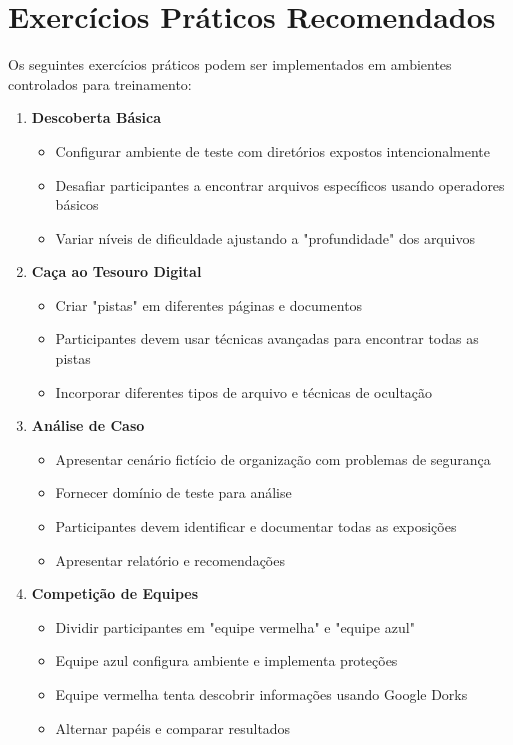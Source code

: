 \documentclass[12pt,a4paper]{book}
\begin{document}
\section{Exercícios Práticos Recomendados}

Os seguintes exercícios práticos podem ser implementados em ambientes controlados para treinamento:

\begin{enumerate}
    \item \textbf{Descoberta Básica}
    \begin{itemize}
        \item Configurar ambiente de teste com diretórios expostos intencionalmente
        \item Desafiar participantes a encontrar arquivos específicos usando operadores básicos
        \item Variar níveis de dificuldade ajustando a "profundidade" dos arquivos
    \end{itemize}
    
    \item \textbf{Caça ao Tesouro Digital}
    \begin{itemize}
        \item Criar "pistas" em diferentes páginas e documentos
        \item Participantes devem usar técnicas avançadas para encontrar todas as pistas
        \item Incorporar diferentes tipos de arquivo e técnicas de ocultação
    \end{itemize}
    
    \item \textbf{Análise de Caso}
    \begin{itemize}
        \item Apresentar cenário fictício de organização com problemas de segurança
        \item Fornecer domínio de teste para análise
        \item Participantes devem identificar e documentar todas as exposições
        \item Apresentar relatório e recomendações
    \end{itemize}
    
    \item \textbf{Competição de Equipes}
    \begin{itemize}
        \item Dividir participantes em "equipe vermelha" e "equipe azul"
        \item Equipe azul configura ambiente e implementa proteções
        \item Equipe vermelha tenta descobrir informações usando Google Dorks
        \item Alternar papéis e comparar resultados
    \end{itemize}
    

\end{enumerate}
\end{document}
